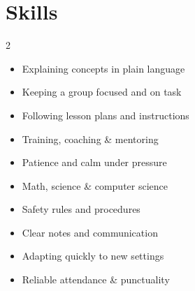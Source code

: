 \documentclass[10.5pt, letterpaper]{article}
\begin{document}
\section{Skills}

\begin{multicols}{2}
\begin{itemize}
  \item Explaining concepts in plain language
  \item Keeping a group focused and on task
  \item Following lesson plans and instructions
  \item Training, coaching \& mentoring
  \item Patience and calm under pressure
  \item Math, science \& computer science
  \item Safety rules and procedures
  \item Clear notes and communication
  \item Adapting quickly to new settings
  \item Reliable attendance \& punctuality
\end{itemize}
\end{multicols}
\end{document}
